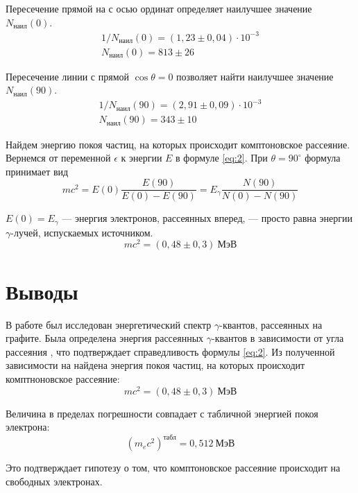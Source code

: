 \documentclass[a4paper, 12pt]{article}
\begin{document}
Пересечение прямой на  с осью ординат определяет наилучшее
значение $N _{\text{наил}} (0)$. 
\begin{equation*}
    \begin{gathered}
    1/N _{\text{наил}} (0) = (1,23 \pm 0,04) \cdot 10 ^{-3}\\
    N _{\text{наил}} (0) = 813 \pm 26
    \end{gathered}
\end{equation*}


Пересечение линии  с прямой $\cos \theta = 0$ позволяет найти наилучшее
значение $N _{\text{наил}} (90)$.
\begin{equation*}
    \begin{gathered}
    1/N _{\text{наил}} (90) = (2,91 \pm 0,09) \cdot 10 ^{-3}\\
    N _{\text{наил}} (90) = 343 \pm 10
    \end{gathered}
\end{equation*}


Найдем энергию покоя частиц, на которых происходит комптоновское
рассеяние. Вернемся от переменной $\epsilon$ к энергии $E$ в формуле
\eqref{eq:2}. При $\theta = 90 ^{\circ}$ формула принимает вид
\begin{equation}
    mc^2 = E (0) \frac{ E (90) }{ E (0) - E (90) } = E _{\gamma}
    \frac{N (90)}{N (0) - N (90)}
    \label{eq:4}
\end{equation}

$E (0) = E _{\gamma}$ --- энергия электронов, рассеянных вперед, ---
просто равна энергии $\gamma$-лучей, испускаемых источником. 
\[
    mc^2 = (0,48 \pm 0,3)\: \text{МэВ}
\]

\section{Выводы}
В работе был исследован энергетический спектр $\gamma$-квантов,
рассеянных на графите. Была определена энергия рассеянных
$\gamma$-квантов в зависимости от угла рассеяния
, что подтверждает справедливость формулы
\eqref{eq:2}. Из полученной зависимости на  найдена
энергия покоя частиц, на которых происходит комптноновское
рассеяние:
\[
    mc^2 = (0,48 \pm 0,3)\: \text{МэВ}
\]

Величина в пределах погрешности совпадает с табличной энергией
покоя электрона:
\[
    (m_e c^2) ^{\text{табл}} = 0,512\: \text{МэВ}
\]

Это подтверждает гипотезу о том, что комптоновское рассеяние происходит на свободных
электронах. 
\end{document}
